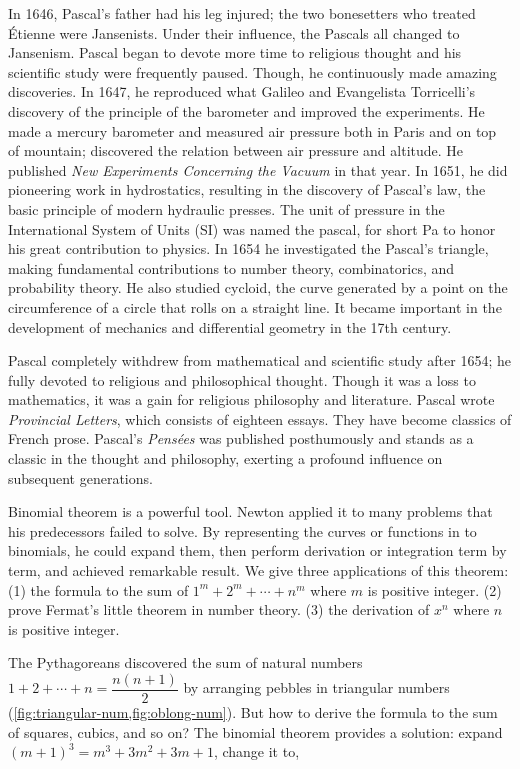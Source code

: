 \documentclass[b5paper]{article}
\begin{document}
\begin{mdframed}
In 1646, Pascal's father had his leg injured; the two bonesetters who treated Étienne were Jansenists. Under their influence, the Pascals all changed to Jansenism. Pascal began to devote more time to religious thought and his scientific study were frequently paused. Though, he continuously made amazing discoveries. In 1647, he reproduced what Galileo and Evangelista Torricelli's discovery of the principle of the barometer and improved the experiments. He made a mercury barometer and measured air pressure both in Paris and on top of mountain; discovered the relation between air pressure and altitude. He published \emph{New Experiments Concerning the Vacuum} in that year. In 1651, he did pioneering work in hydrostatics, resulting in the discovery of Pascal's law, the basic principle of modern hydraulic presses. The unit of pressure in the International System of Units (SI) was named the pascal, for short Pa to honor his great contribution to physics. In 1654 he investigated the Pascal's triangle, making fundamental contributions to number theory, combinatorics, and probability theory. He also studied cycloid, the curve generated by a point on the circumference of a circle that rolls on a straight line. It became important in the development of mechanics and differential geometry in the 17th century.

Pascal completely withdrew from mathematical and scientific study after 1654; he fully devoted to religious and philosophical thought. Though it was a loss to mathematics, it was a gain for religious philosophy and literature. Pascal wrote \emph{Provincial Letters}, which consists of eighteen essays. They have become classics of French prose. Pascal's \emph{Pensées} was published posthumously and stands as a classic in the thought and philosophy, exerting a profound influence on subsequent generations\cite{Jerphagnon-Orcibal-2025}.
\end{mdframed}

Binomial theorem is a powerful tool. Newton applied it to many problems that his predecessors failed to solve. By representing the curves or functions in to binomials, he could expand them, then perform derivation or integration term by term, and achieved remarkable result. We give three applications of this theorem: (1) the formula to the sum of $1^m + 2^m + \dotsb  + n^m$ where $m$ is positive integer. (2) prove Fermat's little theorem in number theory. (3) the derivation of $x^n$ where $n$ is positive integer.

The Pythagoreans discovered the sum of natural numbers $1 + 2 + \dotsb + n = \dfrac{n(n+1)}{2}$ by arranging pebbles in triangular numbers (\cref{fig:triangular-num,fig:oblong-num}). But how to derive the formula to the sum of squares, cubics, and so on? The binomial theorem provides a solution: expand $(m + 1)^3 = m^3 + 3m^2 + 3m + 1$, change it to,
\end{document}
